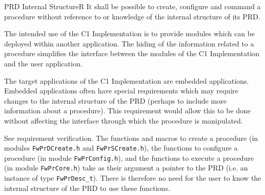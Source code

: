 \documentclass[a4paper,10pt]{article}
\newenvironment{fw_req}[6]
{\addtocounter{subsubsection}{1}
	\hspace{0.2cm}\textbf{FW-\arabic{section}.\arabic{subsection}.\arabic{subsubsection}/#2
	\hspace{0.8cm} #1}
	\vspace{-10pt}
\begin{longtable}{p{2.7cm}P{8.5cm}}
\hline
\textsc{Requirement} & #3 \\
\textsc{Justification} & #4 \\
\textsc{Implementation} & #5  \\ 
\textsc{Verification} & #6  \\
\hline
}
{\end{longtable}}
\begin{document}
\begin{fw_req}{PRD Internal Structure}{R}
{It shall be possible to create, configure and command a procedure
 without reference to or knowledge of the internal structure of its PRD.}
{The intended use of the C1 Implementation is to provide modules 
which can be deployed within another application. 
The hiding of the information related to a procedure simplifies the interface between 
the modules of the C1 Implementation and the user application.

The target applications of the C1 Implementation are embedded applications. 
Embedded applications often have special requirements which may require changes to the internal 
structure of the PRD (perhaps to include more information about a procedure). 
This requirement would allow this to be done without affecting the interface through which 
the procedure is manipulated.} 
{See requirement verification.} 
{The functions and macros to create a procedure 
(in modules \texttt{FwPrDCreate.h} and \texttt{FwPrSCreate.h}), 
the functions to configure a procedure (in module \texttt{FwPrConfig.h}), and the 
functions to execute a procedure (in module \texttt{FwPrCore.h}) 
take as their argument a pointer to the PRD (i.e. an instance of type \texttt{FwPrDesc\_t}). 
There is therefore no need for the user to know the internal structure of the PRD to use these functions.}
\end{fw_req}
\end{document}
